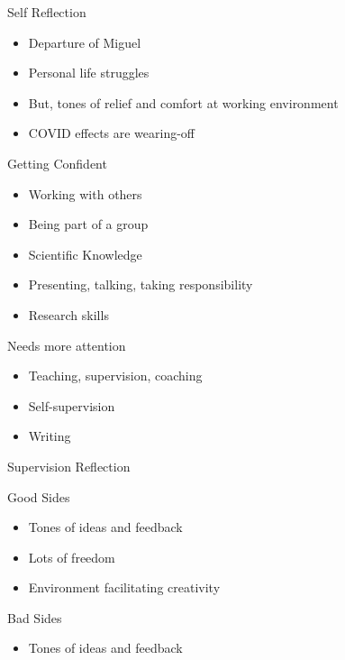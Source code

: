 \documentclass[aspectratio=169]{beamer}
\begin{document}
\begin{frame}{Self Reflection}
  {
    \begin{itemize}
      \item Departure of Miguel
      \item Personal life struggles
      \item But, tones of relief and comfort at working environment
      \item COVID effects are wearing-off 
    \end{itemize}
  }
  \begin{minipage}{0.5\textwidth}
    {

    \color{Pink} Getting Confident
    \begin{itemize}
      \item Working with others
      \item Being part of a group
      \item Scientific Knowledge
      \item Presenting, talking, taking responsibility 
      \item Research skills
    \end{itemize}
  }
  \end{minipage}%
  \begin{minipage}{0.5\textwidth}
  {
    \color{Pink} Needs more attention
    \begin{itemize}
      \item Teaching, supervision, coaching
      \item Self-supervision
      \item Writing 
    \end{itemize}
  }
  \end{minipage}
\end{frame}

\begin{frame}{Supervision Reflection}
  \begin{minipage}{0.5\textwidth}
    \color{Pink} Good Sides 
    \begin{itemize}
      \item Tones of ideas and feedback
      \item Lots of freedom 
      \item Environment facilitating creativity
    \end{itemize}
  \end{minipage}%
  \begin{minipage}{0.5\textwidth}
  {
    \color{Pink} Bad Sides
    \begin{itemize}
      \item Tones of ideas and feedback
    \end{itemize}
  }
  \end{minipage}
\end{frame}
\end{document}
